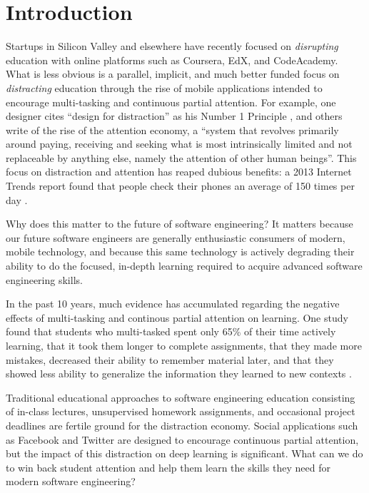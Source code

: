\section{Introduction}

Startups in Silicon Valley and elsewhere have recently focused on {\em disrupting} education with online platforms such as Coursera, EdX, and CodeAcademy.  What is less obvious is a parallel, implicit, and much better funded focus on {\em distracting} education through the rise of mobile applications intended to encourage multi-tasking and continuous partial attention. For example, one designer cites ``design for distraction'' as his Number 1 Principle \cite{Wroblewski2014}, and others write of the rise of the attention economy, a ``system that revolves primarily around paying, receiving and seeking what is most intrinsically limited and not replaceable by anything else, namely the attention of other human beings''\cite{Chamorro-Premuzic2014}. This focus on distraction and attention has reaped dubious benefits: a 2013 Internet Trends report found that people check their phones an average of 150 times per day \cite{Meeker2013}. 

Why does this matter to the future of software engineering?  It matters because our future software engineers are generally enthusiastic consumers of modern, mobile technology, and because this same technology is actively degrading their ability to do the focused, in-depth learning required to acquire advanced software engineering skills.  

In the past 10 years, much evidence has accumulated regarding the negative effects of multi-tasking and continous partial attention on learning. One study found that students who multi-tasked spent only 65\% of their time actively learning, that it took them longer to complete assignments, that they made more mistakes, decreased their ability to remember material later, and that they showed less ability to generalize the information they learned to new contexts \cite{Paul2013}. 

Traditional educational approaches to software engineering education consisting of in-class lectures, unsupervised homework assignments, and occasional project deadlines are fertile ground for the distraction economy.  Social applications such as Facebook and Twitter are designed to encourage continuous partial attention, but the impact of this distraction on deep learning is significant.  What can we do to win back student attention and help them learn the skills they need for modern software engineering? 

